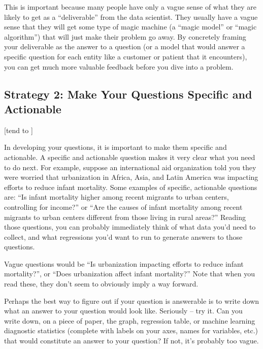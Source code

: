 \documentclass[letterpaper,10pt,english]{jupyterBook}
\begin{document}
\sphinxAtStartPar
This is important because many people have only a vague sense of what they are likely to get as a “deliverable” from the data scientist. They usually have a vague sense that they will get some type of magic machine (a “magic model” or “magic algorithm”) that will just make their problem go away. By concretely framing your deliverable as the answer to a question (or a model that would answer a specific question for each entity like a customer or patient that it encounters), you can get much more valuable feedback before you dive into a problem.


\subsection{Strategy 2: Make Your Questions Specific and Actionable}
\label{\detokenize{20_problems_to_questions/20_stakeholder_management:strategy-2-make-your-questions-specific-and-actionable}}
\sphinxAtStartPar
{[}tend to {]}

\sphinxAtStartPar
In developing your questions, it is important to make them specific and actionable. A specific and actionable question makes it very clear what you need to do next. For example, suppose an international aid organization told you they were worried that urbanization in Africa, Asia, and Latin America was impacting efforts to reduce infant mortality. Some examples of specific, actionable questions are: “Is infant mortality higher among recent migrants to urban centers, controlling for income?” or “Are the causes of infant mortality among recent migrants to urban centers different from those living in rural areas?” Reading those questions, you can probably immediately think of what data you’d need to collect, and what regressions you’d want to run to generate answers to those questions.

\sphinxAtStartPar
Vague questions would be “Is urbanization impacting efforts to reduce infant mortality?”, or “Does urbanization affect infant mortality?” Note that when you read these, they don’t seem to obviously imply a way forward.

\sphinxAtStartPar
Perhaps the best way to figure out if your question is answerable is to write down what an answer to your question would look like. Seriously – try it. Can you write down, on a piece of paper, the graph, regression table, or machine learning diagnostic statistics (complete with labels on your axes, names for variables, etc.) that would constitute an answer to your question? If not, it’s probably too vague.
\end{document}
